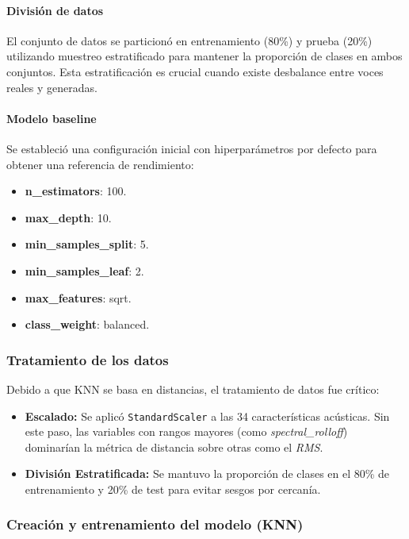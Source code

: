 \paragraph{División de datos}
El conjunto de datos se particionó en entrenamiento (80\%) y prueba (20\%) utilizando muestreo estratificado para mantener la proporción de clases en ambos conjuntos. Esta estratificación es crucial cuando existe desbalance entre voces reales y generadas.

\paragraph{Modelo baseline}
Se estableció una configuración inicial con hiperparámetros por defecto para obtener una referencia de rendimiento:

\begin{itemize}
	\item \textbf{n\_estimators}: 100.
	\item \textbf{max\_depth}: 10.
	\item \textbf{min\_samples\_split}: 5.
	\item \textbf{min\_samples\_leaf}: 2.
	\item \textbf{max\_features}: sqrt.
	\item \textbf{class\_weight}: balanced.
\end{itemize}

\subsubsection*{Tratamiento de los datos}
Debido a que KNN se basa en distancias, el tratamiento de datos fue crítico:
\begin{itemize}
    \item \textbf{Escalado:} Se aplicó \texttt{StandardScaler} a las 34 características acústicas. Sin este paso, las variables con rangos mayores (como \textit{spectral\_rolloff}) dominarían la métrica de distancia sobre otras como el \textit{RMS}.
    \item \textbf{División Estratificada:} Se mantuvo la proporción de clases en el 80\% de entrenamiento y 20\% de test para evitar sesgos por cercanía.
\end{itemize}

\subsubsection*{Creación y entrenamiento del modelo (KNN)}


